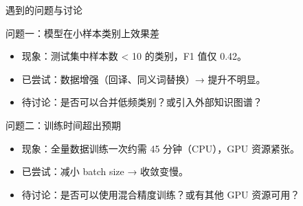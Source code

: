 \documentclass[aspectratio=169]{beamer}
\begin{document}

\begin{frame}{遇到的问题与讨论}
  \begin{alertblock}{问题一：模型在小样本类别上效果差}
    \begin{itemize}
      \item 现象：测试集中样本数 < 10 的类别，F1 值仅 0.42。
      \item 已尝试：数据增强（回译、同义词替换）→ 提升不明显。
      \item 待讨论：是否可以合并低频类别？或引入外部知识图谱？
    \end{itemize}
  \end{alertblock}

  \vspace{0.5em}
  \begin{alertblock}{问题二：训练时间超出预期}
    \begin{itemize}
      \item 现象：全量数据训练一次约需 45 分钟（CPU），GPU 资源紧张。
      \item 已尝试：减小 batch size → 收敛变慢。
      \item 待讨论：是否可以使用混合精度训练？或有其他 GPU 资源可用？
    \end{itemize}
  \end{alertblock}
\end{frame}

\end{document}
